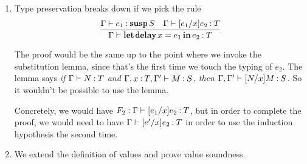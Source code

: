 \documentclass[11pt,letterpaper]{article}
\DeclareMathOperator{\LetOp}{\mathqd{let}}
\DeclareMathOperator{\InOp}{\mathqd{in}}
\newcommand{\Let}[2]{\LetOp #1 \InOp #2}
\DeclareMathOperator{\DelayOp}{\mathqd{delay}}
\newcommand{\delay}{\DelayOp}
\DeclareMathOperator{\SuspOp}{\mathqd{susp}}
\newcommand{\susp}{\SuspOp}
\begin{document}
\begin{enumerate}
\begin{proof}
\begin{description}
          By inversion of the typing rule for the $\Let{\cdot}{\cdot}$ form, we
          deduce
          \begin{align*}
            \mathcal{F}_1 &: \Gamma \proves e_1 \hastype \susp S \\
            \mathcal{F}_2 &: \Gamma, x \hastype S \proves e_2 \hastype T
          \end{align*}

          By the induction hypothesis on $\mathcal{F}_1$ and $\mathcal{D}_1$,
          we deduce
          $\Gamma \proves \delay e^\prime \hastype \susp S$.

          By inverting the typing rule for $\delay$ introduction, we deduce
          $\mathcal{F} : \Gamma \proves e^\prime \hastype S$.

          By the substitution lemma on $\mathcal{F}$ and $\mathcal{F}_2$,
          we deduce
          $\mathcal{F}^\prime : \Gamma \proves [e^\prime/x]e_2 \hastype T$.

          By the induction hypothesis on
          $\mathcal{F}^\prime$ and $\mathcal{D}^\prime$,
          we deduce $\mathcal{E} : \Gamma \proves v \hastype T$.
      \end{description}
    \end{proof}

  \item
    Type preservation breaks down if we pick the rule
    \begin{equation*}
      \infer{\Gamma \proves \Let{\delay x = e_1}{e_2} \hastype T}{%
        \Gamma \proves e_1 \hastype \susp S
        &
        \Gamma \proves [e_1/x]e_2 \hastype T
      }
    \end{equation*}

    The proof would be the same up to the point where we invoke the
    substitution lemma, since that's the first time we touch the typing of
    $e_2$.
    The lemma says
    \emph{%
      if $\Gamma \vdash N \mathbin{:} T$
      and $\Gamma, x \mathbin{:} T, \Gamma^\prime \vdash M \mathbin{:} S$,
      then $\Gamma, \Gamma^\prime \vdash [N/x]M \mathbin{:} S$.
    }
    So it wouldn't be possible to use the lemma.

    Concretely, we would have
    $F_2 : \Gamma \vdash [e_1/x]e_2 \mathbin{:} T$,
    but in order to complete the proof, we would need
    to have $\Gamma \vdash [e^\prime/x]e_2 \mathbin{:} T$
    in order to use the induction hypothesis the second time.

  \item
    We extend the definition of values and prove value soundness.


\end{enumerate}
\end{document}

